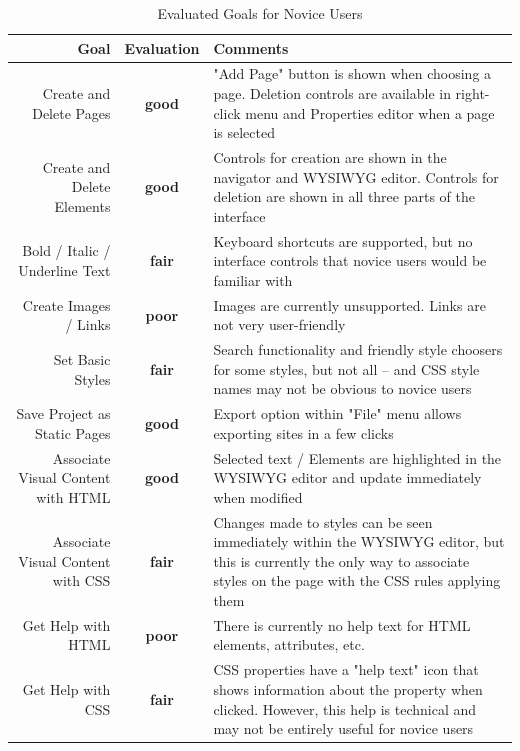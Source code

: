 \documentclass[conference, letterpaper]{IEEEtran}
\begin{document}
\begin{table}[!t]
\renewcommand{\arraystretch}{1.3}
\caption{Evaluated Goals for Novice Users}
\label{table:novice_goals}
\centering
\begin{tabular}{|r|c|p{8cm}|}
\hline
Goal & Evaluation & Comments \\
\hline \hline
Create and Delete Pages & \textbf{\color{ForestGreen}good} & "Add Page" button is shown when choosing a page. Deletion controls are available in right-click menu and Properties editor when a page is selected \\
\hline
Create and Delete Elements & \textbf{\color{ForestGreen}good} & Controls for creation are shown in the navigator and WYSIWYG editor. Controls for deletion are shown in all three parts of the interface \\
\hline
Bold / Italic / Underline Text & \textbf{\color{Dandelion}fair} & Keyboard shortcuts are supported, but no interface controls that novice users would be familiar with \\
\hline
Create Images / Links & \textbf{\color{Red}poor} & Images are currently unsupported. Links are not very user-friendly \\
\hline
Set Basic Styles & \textbf{\color{Dandelion}fair} & Search functionality and friendly style choosers for some styles, but not all -- and CSS style names may not be obvious to novice users \\
\hline
Save Project as Static Pages & \textbf{\color{ForestGreen}good} & Export option within "File" menu allows exporting sites in a few clicks \\
\hline
Associate Visual Content with HTML & \textbf{\color{ForestGreen}good} & Selected text / Elements are highlighted in the WYSIWYG editor and update immediately when modified \\
\hline
Associate Visual Content with CSS & \textbf{\color{Dandelion}fair} & Changes made to styles can be seen immediately within the WYSIWYG editor, but this is currently the only way to associate styles on the page with the CSS rules applying them  \\
\hline
Get Help with HTML & \textbf{\color{Red}poor} & There is currently no help text for HTML elements, attributes, etc. \\
\hline
Get Help with CSS & \textbf{\color{Dandelion}fair} & CSS properties have a "help text" icon that shows information about the property when clicked. However, this help is technical and may not be entirely useful for novice users \\
\hline
\end{tabular}
\end{table}
\end{document}
